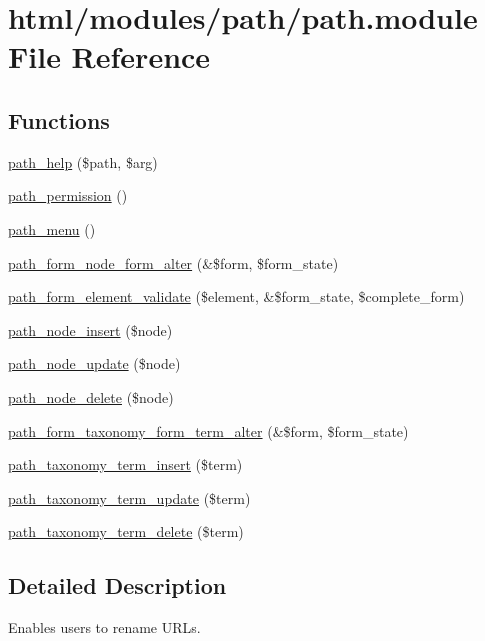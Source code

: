 \hypertarget{path_8module}{
\section{html/modules/path/path.module File Reference}
\label{path_8module}
}
\subsection*{Functions}
\begin{DoxyCompactItemize}
\item 
\hyperlink{path_8module_a500b2dea361fb40f846bf92324083ec1}{path\_\-help} (\$path, \$arg)
\item 
\hyperlink{path_8module_a181c4caf27e3aae5d7ca27d7cd5969ad}{path\_\-permission} ()
\item 
\hyperlink{path_8module_a6c7f7ffe91d659b875298a5a51f17c99}{path\_\-menu} ()
\item 
\hyperlink{path_8module_a00820fa0737926aa9d5aa1852cac785f}{path\_\-form\_\-node\_\-form\_\-alter} (\&\$form, \$form\_\-state)
\item 
\hyperlink{path_8module_a6bf1b7c5d98d593f2ca89b3f2eb199fe}{path\_\-form\_\-element\_\-validate} (\$element, \&\$form\_\-state, \$complete\_\-form)
\item 
\hyperlink{path_8module_adfa9f770accf52fe38e8b5e1584d1be1}{path\_\-node\_\-insert} (\$node)
\item 
\hyperlink{path_8module_a1ad202fd90097a64c90c79cf5f01b852}{path\_\-node\_\-update} (\$node)
\item 
\hyperlink{path_8module_a4b474a9f9d1b6a2e456025830f0c18de}{path\_\-node\_\-delete} (\$node)
\item 
\hyperlink{path_8module_ab15bd047850b30b5f4e19abadc0eaeb2}{path\_\-form\_\-taxonomy\_\-form\_\-term\_\-alter} (\&\$form, \$form\_\-state)
\item 
\hyperlink{path_8module_afbd7116ea85d002c8aeb2c779db810d2}{path\_\-taxonomy\_\-term\_\-insert} (\$term)
\item 
\hyperlink{path_8module_abd04de55f3d2a8aa640441efcfd3e70c}{path\_\-taxonomy\_\-term\_\-update} (\$term)
\item 
\hyperlink{path_8module_ad281728f6950698548fbe837b9e17444}{path\_\-taxonomy\_\-term\_\-delete} (\$term)
\end{DoxyCompactItemize}


\subsection{Detailed Description}
Enables users to rename URLs. 

